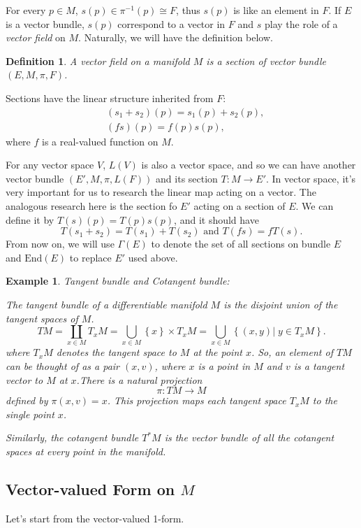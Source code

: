 \documentclass[11pt]{article}
\theoremstyle{plain}%
\newtheorem{defi}{Definition}[section]%
\newtheorem{exa}{Example}[section]%
\begin{document}
For every $p\in M$, $s(p)\in \pi^{-1}(p) \cong F$, thus $s(p)$ is like an element in $F$. If $E$ is a vector bundle, $s(p)$ correspond to a vector in $F$ and $s$ play the role of a \textit{vector field} on $M$. Naturally, we will have the definition below.
\begin{defi}
	A vector field on a manifold $M$ is a section of vector bundle $(E,M,\pi,F)$.
\end{defi}
Sections have the linear structure inherited from $F$:
\[
	\begin{split}
		&(s_1+s_2)(p)=s_1(p)+s_2(p),\\
		&(fs)(p)=f(p)s(p),
	\end{split}
\]
where $f$ is a real-valued function on $M$.

For any vector space $V$, $L(V)$ is also a vector space, and so we can have another vector bundle $(E',M,\pi,L(F))$ and its section $T:M\rightarrow E'$. In vector space, it's very important for us to research the linear map acting on a vector. The analogous research here is the section fo $E'$ acting on a section of $E$. We can define it by $T(s)(p)=T(p)s(p)$, and it should have
\[
	T(s_1+s_2)=T(s_1)+T(s_2) \text{\ and\ } T(fs)=fT(s).
\]
From now on, we will use $\Gamma(E)$ to denote the set of all sections on bundle $E$ and $\mathrm{End}(E)$ to replace $E'$ used above.
\begin{exa}
	Tangent bundle and Cotangent bundle:

	The tangent bundle of a differentiable manifold $M$ is the disjoint union of the tangent spaces of $M$.
	\[
		TM =\coprod_{x\in M}T_xM=\bigcup_{x\in M} \left\{x\right\}\times T_xM
		=\bigcup_{x\in M} \left\{(x, y)\vert\; y\in T_xM\right\}.
	\]
	where $T_xM$ denotes the tangent space to $M$ at the point $x$. So, an element of $TM$ can be thought of as a pair $(x, v)$, where $x$ is a point in $M$ and $v$ is a tangent vector to $M$ at $x$.There is a natural projection 
	\[
		\pi : TM \rightarrow M 
	\]
	defined by $\pi(x, v) = x$. This projection maps each tangent space $T_xM$ to the single point $x$.

	Similarly, the cotangent bundle $T^*\!M$ is the vector bundle of all the cotangent spaces at every point in the manifold.
\end{exa}
\subsection{Vector-valued Form on $M$}
Let's start from the vector-valued 1-form. 
\end{document}
